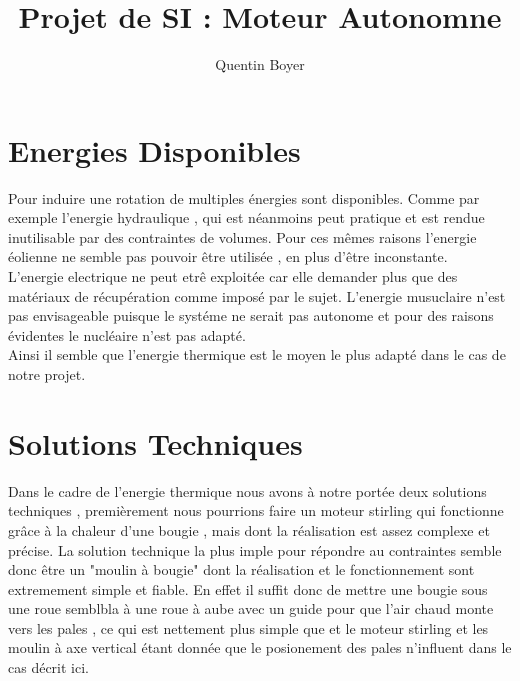 \documentclass[a4paper,12pt]{article}
\title{Projet de SI : Moteur Autonomne}
\author{Quentin Boyer}
\begin{document}
\maketitle
\tableofcontents

\section{Energies Disponibles}

\indent  Pour induire une rotation de multiples énergies sont disponibles. Comme par exemple l'energie hydraulique , qui est néanmoins peut pratique et est rendue inutilisable par des contraintes de volumes. Pour ces mêmes raisons l'energie éolienne ne semble pas pouvoir être utilisée , en plus d'être inconstante.\\[0.3cm]
\indent  L'energie electrique ne peut etrê exploitée car elle demander plus que des matériaux de récupération comme imposé par le sujet. L'energie musuclaire n'est pas envisageable puisque le systéme ne serait pas autonome et pour des raisons évidentes le nucléaire n'est pas adapté.\\[0.3cm]
\indent  Ainsi il semble que l'energie thermique est le moyen le plus adapté dans le cas de notre projet.\\[0.05cm]

\pagebreak

\section{Solutions Techniques}
  Dans le cadre de l'energie thermique nous avons à notre portée deux solutions techniques , premièrement nous pourrions faire un moteur stirling qui fonctionne grâce à la chaleur d'une bougie , mais dont la réalisation est assez complexe et précise. La solution technique la plus imple pour répondre au contraintes semble donc être un "moulin à bougie" dont la réalisation et le fonctionnement sont extremement simple et fiable. En effet il suffit donc de mettre une bougie sous une roue semblbla à une roue à aube avec un guide pour que l'air chaud monte vers les pales , ce qui est nettement plus simple que et le moteur stirling et les moulin à axe vertical étant donnée que le posionement des pales n'influent dans le cas décrit ici.
\end{document}
